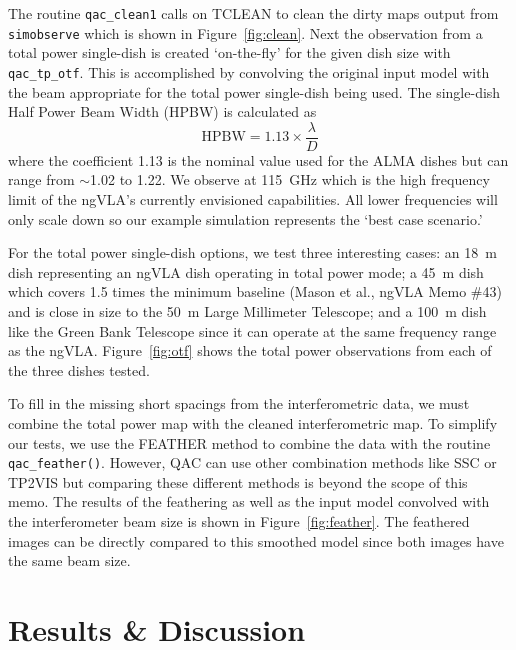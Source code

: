 \documentclass[12pt]{article}
\begin{document}
The routine \texttt{qac\_clean1} calls on TCLEAN to clean the dirty maps output from \texttt{simobserve} which is shown in Figure~\ref{fig:clean}. Next the observation from a total power single-dish is created `on-the-fly' for the given dish size with \texttt{qac\_tp\_otf}. This is accomplished by convolving the original input model with the beam appropriate for the total power single-dish being used. The single-dish Half Power Beam Width (HPBW) is calculated as
\begin{equation}
\text{HPBW} = 1.13 \times \frac{\lambda}{D}
\end{equation}
where the coefficient 1.13 is the nominal value used for the ALMA dishes but can range from $\sim$1.02 to 1.22. We observe at \SI{115}{\giga\hertz} which is the high frequency limit of the ngVLA's currently envisioned capabilities. All lower frequencies will only scale down so our example simulation represents the `best case scenario.' 

For the total power single-dish options, we test three interesting cases: an \SI{18}{\meter} dish representing an ngVLA dish operating in total power mode; a \SI{45}{\meter} dish which covers 1.5 times the minimum baseline (Mason et al., ngVLA Memo \#43) and is close in size to the \SI{50}{\meter} Large Millimeter Telescope; and a \SI{100}{\meter} dish like the Green Bank Telescope since it can operate at the same frequency range as the ngVLA. Figure~\ref{fig:otf} shows the total power observations from each of the three dishes tested. 

To fill in the missing short spacings from the interferometric data, we must combine the total power map with the cleaned interferometric map. To simplify our tests, we use the FEATHER method to combine the data with the routine \texttt{qac\_feather()}. However, QAC can use other combination methods like SSC or TP2VIS but comparing these different methods is beyond the scope of this memo. The results of the feathering as well as the input model convolved with the interferometer beam size is shown in Figure~\ref{fig:feather}. The feathered images can be directly compared to this smoothed model since both images have the same beam size. 

\section*{Results \& Discussion}
\end{document}
